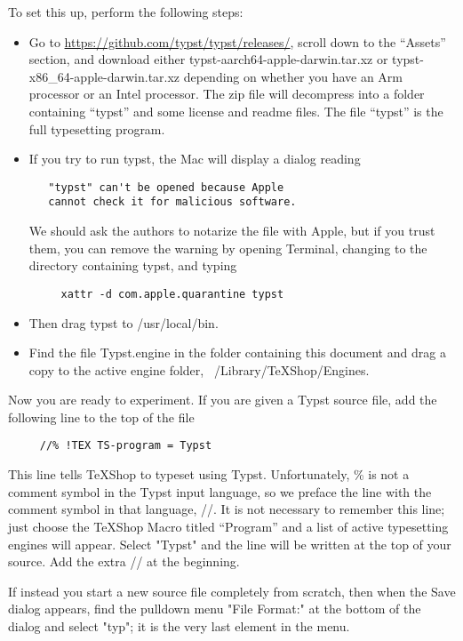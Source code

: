 \documentclass[11pt, oneside]{article}   	%
\begin{document}
To set this up, perform the following steps:
\begin{itemize}
\item Go to  \url{https://github.com/typst/typst/releases/}, scroll down to the ``Assets'' section, and download either typst-aarch64-apple-darwin.tar.xz or typst-x86\_64-apple-darwin.tar.xz depending on whether you have an Arm processor or an Intel processor. The zip file will decompress into a folder containing  ``typst'' and some license and readme files. The file ``typst'' is the full typesetting program.
\item
If you try to run typst, the Mac will display a dialog reading
\begin{verbatim}
   "typst" can't be opened because Apple 
   cannot check it for malicious software.
\end{verbatim}
We should ask the authors to notarize the file with Apple, but if you trust them, you can remove the
warning by opening Terminal, changing to the directory containing typst, and typing
\begin{verbatim}
     xattr -d com.apple.quarantine typst
\end{verbatim}
\item Then drag typst to /usr/local/bin.
\item Find the file Typst.engine in the folder containing this document 
and drag a copy to the active engine folder, ~/Library/TeXShop/Engines.
\end{itemize}
\vspace{.2 in}

Now you are ready to experiment. If you are given a Typst source file, add the following line to the top of the file
\begin{verbatim}
     //% !TEX TS-program = Typst
\end{verbatim}
This line tells TeXShop to typeset using Typst. Unfortunately, \% is not a comment symbol in the Typst input language, so we preface the line with the comment symbol in that language, //. It is not necessary to remember this line; just
choose the TeXShop Macro titled  ``Program'' and a list of active typesetting engines will appear. Select "Typst" and
the line will be written at the top of your source. Add the extra // at the beginning.

If instead you start a new source file completely from scratch, then when the Save dialog appears, find the pulldown menu "File Format:" at the bottom of the dialog and select "typ"; it is the very last element in the menu. 
\end{document}
